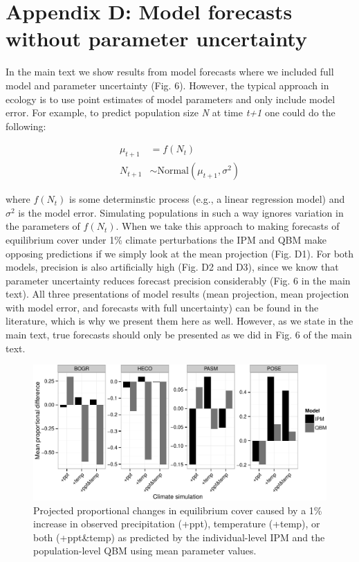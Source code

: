 \documentclass[12pt,]{article}
\author{}
\date{}
\begin{document}
\normalsize


\renewcommand\thefigure{D\arabic{figure}} 



\section{Appendix D: Model forecasts without parameter
uncertainty}\label{appendix-d-model-forecasts-without-parameter-uncertainty}

In the main text we show results from model forecasts where we included
full model and parameter uncertainty (Fig. 6). However, the typical
approach in ecology is to use point estimates of model parameters and
only include model error. For example, to predict population size
\emph{N} at time \emph{t+1} one could do the following:

\begin{align}
\mu_{t+1} &= f(N_{t}) \\
N_{t+1} &\sim \text{Normal}(\mu_{t+1}, \sigma^2)
\end{align}

where $f(N_t)$ is some determinstic process (e.g., a linear regression
model) and $\sigma^2$ is the model error. Simulating populations in such
a way ignores variation in the parameters of $f(N_t)$. When we take this
approach to making forecasts of equilibrium cover under 1\% climate
perturbations the IPM and QBM make opposing predictions if we simply
look at the mean projection (Fig. D1). For both models, precision is
also artificially high (Fig. D2 and D3), since we know that parameter
uncertainty reduces forecast precision considerably (Fig. 6 in the main
text). All three presentations of model results (mean projection, mean
projection with model error, and forecasts with full uncertainty) can be
found in the literature, which is why we present them here as well.
However, as we state in the main text, true forecasts should only be
presented as we did in Fig. 6 of the main text.

\begin{figure}[htbp]
\centering
\includegraphics{appD/figure/appD-figure_d1.pdf}
\caption{Projected proportional changes in equilibrium cover caused by a
1\% increase in observed precipitation (+ppt), temperature (+temp), or
both (+ppt\&temp) as predicted by the individual-level IPM and the
population-level QBM using mean parameter values.}
\end{figure}
\end{document}
